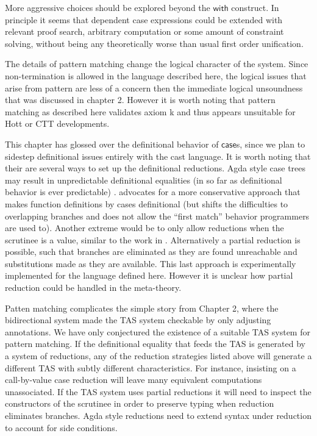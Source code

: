 More aggressive choices should be explored beyond the $\mathsf{with}$
construct. In principle it seems that dependent case expressions could
be extended with relevant proof search, arbitrary computation or some
amount of constraint solving, without being any theoretically worse
than usual first order unification. 



The details of pattern matching change the logical character of the
system\cite{cockx_devriese_2018}. Since non-termination is allowed
in the language described here, the logical issues that arise from
pattern are less of a concern then the immediate logical unsoundness
that was discussed in chapter 2. However it is worth noting that pattern
matching as described here validates axiom k and thus appears unsuitable
for Hott or CTT developments.

This chapter has glossed over the definitional behavior of $\mathsf{case}$s,
since we plan to sidestep definitional issues entirely with the cast
language. It is worth noting that their are several ways to set up
the definitional reductions. Agda style case trees may result in unpredictable
definitional equalities (in so far as definitional behavior is ever
predictable) \cite{10.1007/978-3-642-54833-8_6} . \cite{10.1007/978-3-642-54833-8_6}
advocates for a more conservative approach that makes function definitions
by cases definitional (but shifts the difficulties to overlapping
branches and does not allow the ``first match'' behavior programmers
are used to). Another extreme would be to only allow reductions when
the scrutinee is a value, similar to the work in \cite{sjoberg2012irrelevance}.
Alternatively a partial reduction is possible, such that branches
are eliminated as they are found unreachable and substitutions made
as they are available. This last approach is experimentally implemented
for the language defined here. However it is unclear how partial reduction
could be handled in the meta-theory.

Patten matching complicates the simple story from Chapter 2, where
the bidirectional system made the TAS system checkable by only adjusting
annotations. We have only conjectured the existence of a suitable
TAS system for pattern matching. If the definitional equality that
feeds the TAS is generated by a system of reductions, any of the reduction
strategies listed above will generate a different TAS with subtly
different characteristics. For instance, insisting on a call-by-value
case reduction will leave many equivalent computations unassociated.
If the TAS system uses partial reductions it will need to inspect
the constructors of the scrutinee in order to preserve typing when
reduction eliminates branches. Agda style reductions need to extend
syntax under reduction to account for side conditions. 

